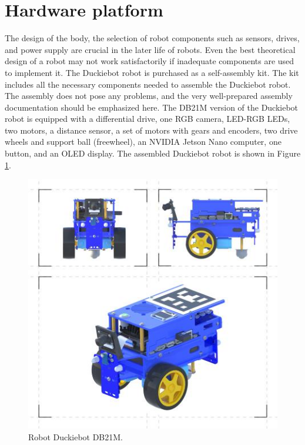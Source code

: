 \documentclass[conference]{IEEEtran}
\begin{document}
\section{Hardware platform}\label{sec:hardware}
The design of the body, the selection of robot components such as sensors, drives, and power supply are crucial in the later life of robots. Even the best theoretical design of a robot may not work satisfactorily if inadequate components are used to implement it. 
The Duckiebot robot is purchased as a self-assembly kit. The kit includes all the necessary components needed to assemble the Duckiebot robot. The assembly does not pose any problems, and the very well-prepared assembly documentation should be emphasized here. The DB21M version of the Duckiebot robot is equipped with a differential drive, one RGB camera, LED-RGB LEDs, two motors, a distance sensor, a set of motors with gears and encoders, two drive wheels and support ball (freewheel), an NVIDIA Jetson Nano computer, one button, and an OLED display. The assembled Duckiebot robot is shown in Figure \ref{fig:robot-duckiebot}.

\begin{figure}
    \centering
    \includegraphics[width=1.0\columnwidth]{d3.jpg}
    \caption{Robot Duckiebot DB21M.}
    \label{fig:robot-duckiebot}
\end{figure}
\end{document}
